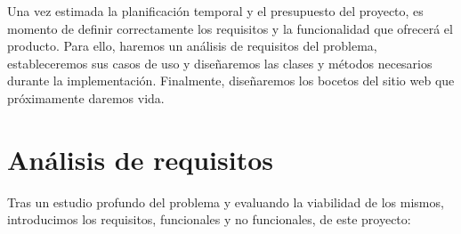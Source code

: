 Una vez estimada la planificación temporal y el presupuesto del proyecto, es momento de definir correctamente los requisitos y la funcionalidad que ofrecerá el producto. Para ello, haremos un análisis de requisitos del problema, estableceremos sus casos de uso y diseñaremos las clases y métodos necesarios durante la implementación. Finalmente, diseñaremos los bocetos del sitio web que próximamente daremos vida.

\section*{Análisis de requisitos}

Tras un estudio profundo del problema y evaluando la viabilidad de los mismos, introducimos los requisitos, funcionales y no funcionales, de este proyecto:

